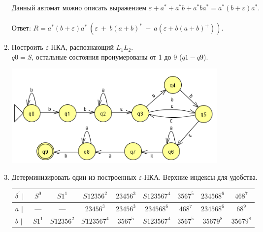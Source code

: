 \documentclass[fleqn,12pt, a4paper]{article}
\newcommand {\eps} {\varepsilon}
\begin{document}
\begin{enumerate}[label=(\roman{*})]

	\vspace{1em}

	Данный автомат можно описать выражением $\eps + a^* + a^*b + a^*ba^* = a^*(b+\eps)a^*$.\\\\
	Ответ: $R = a^*(b+\eps)a^*\ (\eps\ +\ b(a+b)^*\ +\ a (\eps + b(a+b)^+))$.

	\newpage

	\item Построить $\eps$-НКА, распознающий $L_1 L_2$. \\ $q0 = S$, остальные состояния пронумерованы от 1 до 9 ($q1 - q9$).

	\includegraphics[width=11cm]{task3_NF}


	\item Детерминизировать один из построенных $\eps$-НКА. Верхние индексы для удобства.

	\begin{tabular}{lcccccccc}
		\toprule
		\multicolumn{1}{c}{
			$\delta^\prime \mid$
		}
		& \multicolumn{1}{c}{ $S^0$ }
		& \multicolumn{1}{c}{ $S1^1$ }
		& \multicolumn{1}{c}{ $S12356^2$ }
		& \multicolumn{1}{c}{ $23456^3$ }
		& \multicolumn{1}{c}{ $S123567^4$ }
		& \multicolumn{1}{c}{ $3567^5$ }
		& \multicolumn{1}{c}{ $234568^6$ }
		& \multicolumn{1}{c}{ $468^7$ }

		\\
		\midrule

		$a$ $\mid$ &
		--- & --- & $23456^3$ & $23456^3$ & $234568^6$ & $468^7$ & $234568^6$ &  $68^{9}$  \\
		$b$ $\mid$ &
		$S1^1$ & $S12356^2$ & $S123567^4$ & $3567^5$ & $S123567^4$ & $3567^5$ & $35679^8$ & $35679^8$ \\
		\bottomrule
	\end{tabular}


\end{enumerate}
\end{document}
